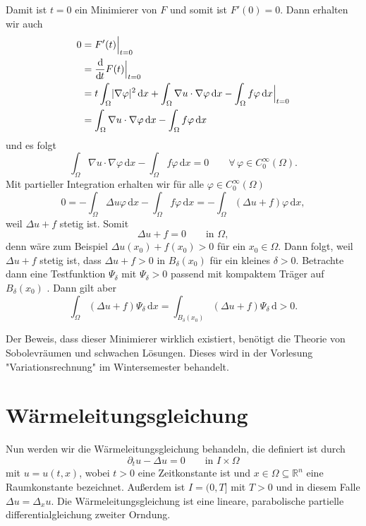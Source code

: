 \begin{beweis}
\begin{description}
\[		\]
		Damit ist $t = 0$ ein Minimierer von $F$ und somit ist $F'(0)=0$. Dann erhalten wir auch
		\begin{align*}
			0 &= F'(t)  \Big|_{t=0}^{} \\ &= \frac{\mathrm{d}\mkern-1.0mu }{\mathrm{d}\mkern-1.0mu t} F(t)  \Big|_{t=0}^{} \\ &= t \int_{\Omega}^{} \lvert \nabla \varphi\rvert^2 \,\mathrm{d}x
			+ \int_{\Omega}^{}  \nabla u \cdot  \nabla \varphi \,\mathrm{d}x - \int_{\Omega}^{} f \varphi \,\mathrm{d}x  \Big|_{t=0}^{} \\
			&= \int_{\Omega}^{}  \nabla u \cdot  \nabla \varphi \,\mathrm{d}x - \int_{\Omega}^{}f \varphi \,\mathrm{d}x
		\end{align*}
	und es folgt
	\[
		\int_{\Omega}^{}  \nabla u \cdot  \nabla \varphi \,\mathrm{d}x - \int_{\Omega}^{} f \varphi \,\mathrm{d}x = 0 \qquad \forall\, \varphi \in C^{\infty}_0(\Omega).
	\]
	Mit partieller Integration erhalten wir für alle $\varphi \in C^{\infty}_0(\Omega)$
	\[
		0 = - \int_{\Omega}^{}  \Delta u  \varphi\,\mathrm{d}x - \int_{\Omega}^{}f \varphi \,\mathrm{d}x = - \int_{\Omega}^{}(  \Delta u + f) \varphi \,\mathrm{d}x,
	\]
	 weil $ \Delta u + f$ stetig ist. Somit
	 \[
	 	\Delta u + f = 0 \qquad \text{in } \Omega,
	 \]
	 denn wäre zum Beispiel $ \Delta u (x_0) + f(x_0) > 0$ für ein $x_0 \in \Omega$. Dann folgt, weil $ \Delta u + f$ stetig ist, dass
	 $\Delta u + f > 0$ in $B_{\delta }(x_0)$ für ein kleines $\delta > 0$. 
	 Betrachte dann eine Testfunktion $\Psi_{\delta}$ mit $\Psi_{\delta } > 0$ passend mit kompaktem Träger auf $B_{\delta }(x_0)$ . 
	 Dann gilt aber
	 \[
	 	\int_{\Omega}^{}( \Delta u + f) \Psi_{\delta } \,\mathrm{d}x = \int_{B_{\delta }(x_0)}^{} ( \Delta u + f)\Psi_{\delta } \,\mathrm{d} > 0.
	 \]
	\end{description}
\end{beweis}

Der Beweis, dass dieser Minimierer wirklich existiert, benötigt die Theorie von Sobolevräumen und schwachen Lösungen. Dieses wird in der Vorlesung "Variationsrechnung" im Wintersemester behandelt. 
\newpage
\section{Wärmeleitungsgleichung} 
\label{sec:warmeleitungsgleichung}
Nun werden wir die Wärmeleitungsgleichung behandeln, die definiert ist durch
\[
	\partial_t u - \Delta u  = 0 \qquad \text{in }I \times \Omega
\]
mit $u = u(t,x)$, wobei $t>0$ eine Zeitkonstante ist und $x \in \Omega \subseteq \mathbb{R}^n$ eine Raumkonstante bezeichnet. Außerdem ist $I = (0,T]$ mit $T>0$ und in diesem Falle $ \Delta u = \Delta_x u$. Die Wärmeleitungsgleichung ist eine lineare, parabolische partielle differentialgleichung zweiter Orndung.

